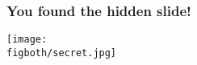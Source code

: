 \documentclass[aspectratio=169,handout]{beamer}
\begin{document}



\begin{frame}\label{fr:hidden}
	\frametitle{You found the hidden slide!}

\begin{center}
\texttt{[image: \\figboth/secret.jpg]}

\end{center}

\medbreak
	\hyperlink{fr:buttons}{}

\end{frame}
\end{document}
